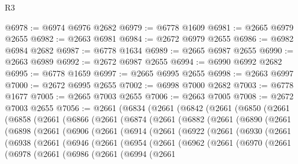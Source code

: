 \begin{lexlean}{R3}
\begin{coremodule}
@6978 := @6974 @6976 @2682
@6979 := @6778 @1609
@6981 := @2665 @6979 @2655
@6982 := @2663 @6981
@6984 := @2672 @6979 @2655
@6986 := @6982 @6984 @2682
@6987 := @6778 @1634
@6989 := @2665 @6987 @2655
@6990 := @2663 @6989
@6992 := @2672 @6987 @2655
@6994 := @6990 @6992 @2682
@6995 := @6778 @1659
@6997 := @2665 @6995 @2655
@6998 := @2663 @6997
@7000 := @2672 @6995 @2655
@7002 := @6998 @7000 @2682
@7003 := @6778 @1677
@7005 := @2665 @7003 @2655
@7006 := @2663 @7005
@7008 := @2672 @7003 @2655
@7056 := @2661
    (@6834
      (@2661
        (@6842
          (@2661
            (@6850
              (@2661
                (@6858
                  (@2661
                    (@6866
                      (@2661
                        (@6874
                          (@2661
                            (@6882
                              (@2661
                                (@6890
                                  (@2661
                                    (@6898
                                      (@2661
                                        (@6906
                                          (@2661
                                            (@6914
                                              (@2661
                                                (@6922
                                                  (@2661
                                                    (@6930
                                                      (@2661
                                                        (@6938
                                                          (@2661
                                                            (@6946
                                                              (@2661
                                                                (@6954
                                                                  (@2661
                                                                    (@6962
                                                                      (@2661
                                                                        (@6970
                                                                          (@2661
                                                                            (@6978
                                                                              (@2661
                                                                                (@6986
                                                                                  (@2661
                                                                                    (@6994
                                                                                      (@2661

\end{coremodule}
\end{lexlean}

